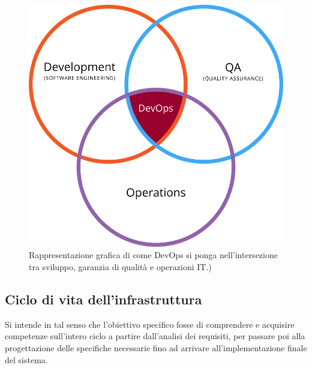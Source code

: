 \documentclass[a4paper,12pt]{report}
\begin{document}
\begin{figure}[h]
	\includegraphics[width=1.0\textwidth]{def_devops}
    \caption{Rappresentazione grafica di come DevOps si ponga nell'intersezione tra sviluppo, garanzia di qualità e operazioni IT.) \cite{defdevops}}
    \label{fig:def_devops}
\end{figure}

\subsection{Ciclo di vita dell'infrastruttura}
Si intende in tal senso che l'obiettivo specifico fosse di comprendere e acquisire competenze sull'intero ciclo a partire dall'analisi dei requisiti, per passare poi alla progettazione delle specifiche necessarie fino ad arrivare all'implementazione finale del sistema.
\end{document}
